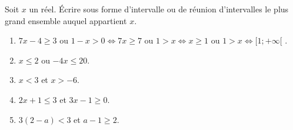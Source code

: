 
Soit $x$ un réel. Écrire sous forme d'intervalle ou de réunion d'intervalles le plus grand ensemble auquel appartient $x$.

\begin{enumerate}
	\item $7x -4 \geq 3$ ou $1-x>0 \Longleftrightarrow  7x  \geq 7$ ou $1 >x \Longleftrightarrow  x  \geq 1$ ou $1 > x \Longleftrightarrow [1;+\infty[$   . 
	
	
	
	
	
	\item $x \leq 2$ ou $-4x \leq 20$.
	\item $x < 3$ et $x > -6$.
	\item $2x+1 \leq 3$ et $3x-1 \geq 0$.
	\item $3(2-a)<3$ et $a-1 \geq 2$.
\end{enumerate}
 
